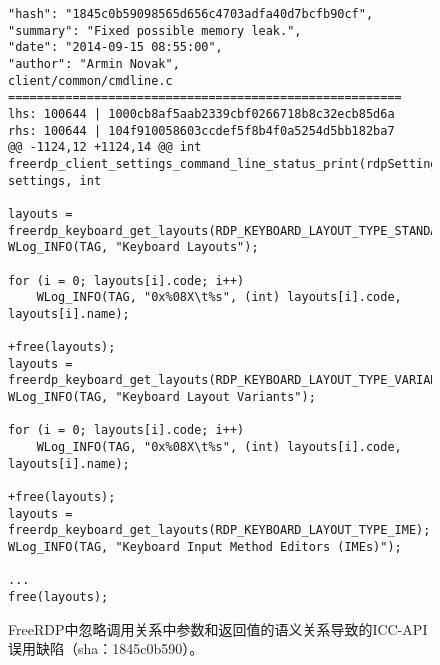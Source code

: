 \begin{figure}[t]
	\centering
\begin{lstlisting}
"hash": "1845c0b59098565d656c4703adfa40d7bcfb90cf",
"summary": "Fixed possible memory leak.",
"date": "2014-09-15 08:55:00",
"author": "Armin Novak",
client/common/cmdline.c
=======================================================
lhs: 100644 | 1000cb8af5aab2339cbf0266718b8c32ecb85d6a
rhs: 100644 | 104f910058603ccdef5f8b4f0a5254d5bb182ba7
@@ -1124,12 +1124,14 @@ int freerdp_client_settings_command_line_status_print(rdpSettings* settings, int

layouts = freerdp_keyboard_get_layouts(RDP_KEYBOARD_LAYOUT_TYPE_STANDARD);
WLog_INFO(TAG, "Keyboard Layouts");

for (i = 0; layouts[i].code; i++)
	WLog_INFO(TAG, "0x%08X\t%s", (int) layouts[i].code, layouts[i].name);
	
+free(layouts);
layouts = freerdp_keyboard_get_layouts(RDP_KEYBOARD_LAYOUT_TYPE_VARIANT);
WLog_INFO(TAG, "Keyboard Layout Variants");

for (i = 0; layouts[i].code; i++)
	WLog_INFO(TAG, "0x%08X\t%s", (int) layouts[i].code, layouts[i].name);

+free(layouts);
layouts = freerdp_keyboard_get_layouts(RDP_KEYBOARD_LAYOUT_TYPE_IME);
WLog_INFO(TAG, "Keyboard Input Method Editors (IMEs)");

...
free(layouts);
\end{lstlisting}
	\caption{
	FreeRDP中忽略调用关系中参数和返回值的语义关系导致的ICC-API误用缺陷（sha：1845c0b590）。
	}
	\label{fig:2-3-icc-2}
\end{figure}